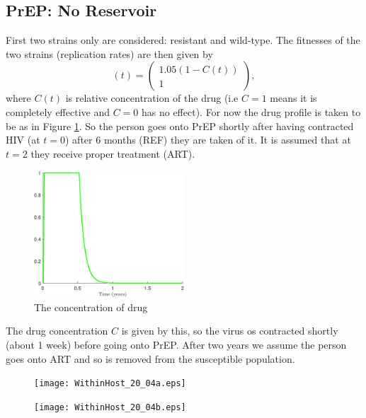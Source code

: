 \documentclass[DIV=15]{scrartcl}
\begin{document}
\subsection*{PrEP: No Reservoir}
First two strains only are considered: resistant and wild-type.  The fitnesses of the two  strains (replication rates)  are then given by \begin{equation}
(t) = \begin{pmatrix}
1.05(1- C(t)) \\1
\end{pmatrix} , 
\label{gamma}
\end{equation}
where $C(t)$ is relative concentration of the drug (i.e $C=1$ means it is completely effective and $C=0$ has no effect). For now the drug profile is taken to  be as in Figure \ref{drug}. So the person goes onto PrEP shortly after having contracted HIV (at $t=0$) after $6$ months (REF) they are taken of it. It is assumed that at $t=2$ they receive proper treatment (ART).
\begin{figure}[h]
\begin{center}
    \includegraphics[width=0.5\textwidth]{DrugConc_19_04a.eps}
\end{center}
	\caption{The concentration of drug}
\label{drug} 
\end{figure}
\iffalse
The drug concentration $C$ is given by this, so the virus os contracted shortly (about 1 week) before going onto PrEP. 
After two years we assume  the person goes  onto ART and so is removed from the  susceptible population.
\begin{figure}
\begin{minipage}{.5\textwidth}
  \texttt{[image: WithinHost\_20\_04a.eps]}
\end{minipage}%
\begin{minipage}{.5\textwidth}
  \texttt{[image: WithinHost\_20\_04b.eps]}
\end{minipage}
\caption{}
\label{fig:80}
\end{figure}
\end{document}
